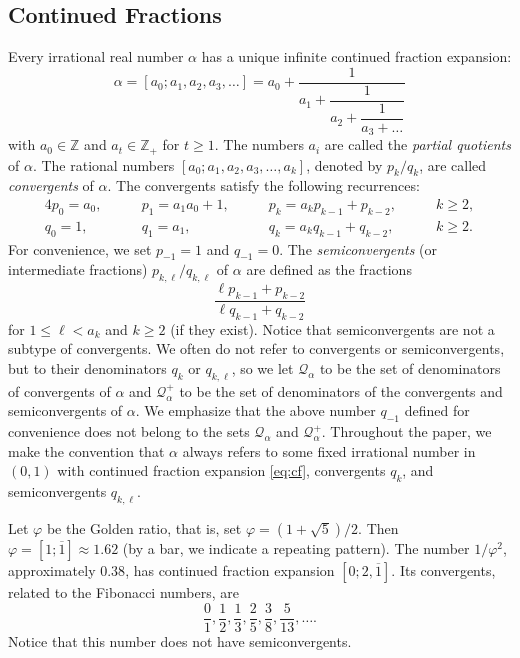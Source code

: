\documentclass[a4paper,fleqn]{article}
\newcommand{\qk}[1]{\mathcal{Q}_{#1}}
\newcommand{\qkl}[1]{\mathcal{Q}^+_{#1}}
\newcommand{\Z}{\mathbb{Z}}
\begin{document}
  \subsection{Continued Fractions}
  Every irrational real number $\alpha$ has a unique infinite continued fraction expansion:
  \begin{equation}\label{eq:cf}
    \alpha = [a_0; a_1, a_2, a_3, \ldots] = a_0 + \dfrac{1}{a_1 + \dfrac{1}{a_2 + \dfrac{1}{a_3 + \ldots}}}
  \end{equation}
  with $a_0 \in \Z$ and $a_t \in \Z_+$ for $t \geq 1$. The numbers $a_i$ are called the \emph{partial
  quotients} of $\alpha$. The rational numbers $[a_0; a_1, a_2, a_3, \ldots, a_k]$, denoted by $p_k / q_k$, are called
  \emph{convergents} of $\alpha$. The convergents satisfy the following recurrences:
  \begin{alignat*}{4}
    p_0 = a_0, &\qquad p_1 = a_1 a_0 + 1, &\qquad p_k = a_k p_{k-1} + p_{k-2}, \qquad& k \geq 2, \\
    q_0 = 1,   &\qquad q_1 = a_1,         &\qquad q_k = a_k q_{k-1} + q_{k-2}, \qquad& k \geq 2.
  \end{alignat*}  
  For convenience, we set $p_{-1} = 1$ and $q_{-1} = 0$. The \emph{semiconvergents} (or intermediate fractions)
  $p_{k,\ell} / q_{k,\ell}$ of $\alpha$ are defined as the fractions
  \begin{equation*}
    \frac{ \ell p_{k-1} + p_{k-2} }{ \ell q_{k-1} + q_{k-2} }
  \end{equation*}
  for $1 \leq \ell < a_k$ and $k \geq 2$ (if they exist). Notice that semiconvergents are not a subtype of convergents.
  We often do not refer to convergents or semiconvergents, but to their denominators $q_k$ or $q_{k,\ell}$, so we let
  $\qk{\alpha}$ to be the set of denominators of convergents of $\alpha$ and $\qkl{\alpha}$ to be the set of
  denominators of the convergents and semiconvergents of $\alpha$. We emphasize that the above number $q_{-1}$ defined
  for convenience does not belong to the sets $\qk{\alpha}$ and $\qkl{\alpha}$. Throughout the paper, we make the
  convention that $\alpha$ always refers to some fixed irrational number in $(0, 1)$ with continued fraction expansion
  \eqref{eq:cf}, convergents $q_k$, and semiconvergents $q_{k,\ell}$.

  \begin{example}
    Let $\varphi$ be the Golden ratio, that is, set $\varphi = (1 + \sqrt{5})/2$. Then
    $\varphi = [1; \overline{1}] \approx 1.62$ (by a bar, we indicate a repeating pattern). The number $1/\varphi^2$,
    approximately $0.38$, has continued fraction expansion $[0; 2, \overline{1}]$. Its convergents, related to the
    Fibonacci numbers, are
    \begin{equation*}
      \frac{0}{1}, \frac{1}{2}, \frac{1}{3}, \frac{2}{5}, \frac{3}{8}, \frac{5}{13}, \ldots.
    \end{equation*}
    Notice that this number does not have semiconvergents.
  \end{example}
\end{document}
